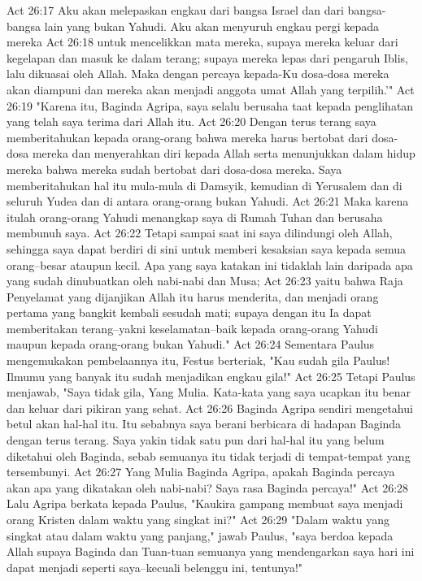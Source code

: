 Act 26:17  Aku akan melepaskan engkau dari bangsa Israel dan dari bangsa-bangsa lain yang bukan Yahudi. Aku akan menyuruh engkau pergi kepada mereka
Act 26:18  untuk mencelikkan mata mereka, supaya mereka keluar dari kegelapan dan masuk ke dalam terang; supaya mereka lepas dari pengaruh Iblis, lalu dikuasai oleh Allah. Maka dengan percaya kepada-Ku dosa-dosa mereka akan diampuni dan mereka akan menjadi anggota umat Allah yang terpilih.'"
Act 26:19  "Karena itu, Baginda Agripa, saya selalu berusaha taat kepada penglihatan yang telah saya terima dari Allah itu.
Act 26:20  Dengan terus terang saya memberitahukan kepada orang-orang bahwa mereka harus bertobat dari dosa-dosa mereka dan menyerahkan diri kepada Allah serta menunjukkan dalam hidup mereka bahwa mereka sudah bertobat dari dosa-dosa mereka. Saya memberitahukan hal itu mula-mula di Damsyik, kemudian di Yerusalem dan di seluruh Yudea dan di antara orang-orang bukan Yahudi.
Act 26:21  Maka karena itulah orang-orang Yahudi menangkap saya di Rumah Tuhan dan berusaha membunuh saya.
Act 26:22  Tetapi sampai saat ini saya dilindungi oleh Allah, sehingga saya dapat berdiri di sini untuk memberi kesaksian saya kepada semua orang--besar ataupun kecil. Apa yang saya katakan ini tidaklah lain daripada apa yang sudah dinubuatkan oleh nabi-nabi dan Musa;
Act 26:23  yaitu bahwa Raja Penyelamat yang dijanjikan Allah itu harus menderita, dan menjadi orang pertama yang bangkit kembali sesudah mati; supaya dengan itu Ia dapat memberitakan terang--yakni keselamatan--baik kepada orang-orang Yahudi maupun kepada orang-orang bukan Yahudi."
Act 26:24  Sementara Paulus mengemukakan pembelaannya itu, Festus berteriak, "Kau sudah gila Paulus! Ilmumu yang banyak itu sudah menjadikan engkau gila!"
Act 26:25  Tetapi Paulus menjawab, "Saya tidak gila, Yang Mulia. Kata-kata yang saya ucapkan itu benar dan keluar dari pikiran yang sehat.
Act 26:26  Baginda Agripa sendiri mengetahui betul akan hal-hal itu. Itu sebabnya saya berani berbicara di hadapan Baginda dengan terus terang. Saya yakin tidak satu pun dari hal-hal itu yang belum diketahui oleh Baginda, sebab semuanya itu tidak terjadi di tempat-tempat yang tersembunyi.
Act 26:27  Yang Mulia Baginda Agripa, apakah Baginda percaya akan apa yang dikatakan oleh nabi-nabi? Saya rasa Baginda percaya!"
Act 26:28  Lalu Agripa berkata kepada Paulus, "Kaukira gampang membuat saya menjadi orang Kristen dalam waktu yang singkat ini?"
Act 26:29  "Dalam waktu yang singkat atau dalam waktu yang panjang," jawab Paulus, "saya berdoa kepada Allah supaya Baginda dan Tuan-tuan semuanya yang mendengarkan saya hari ini dapat menjadi seperti saya--kecuali belenggu ini, tentunya!"
